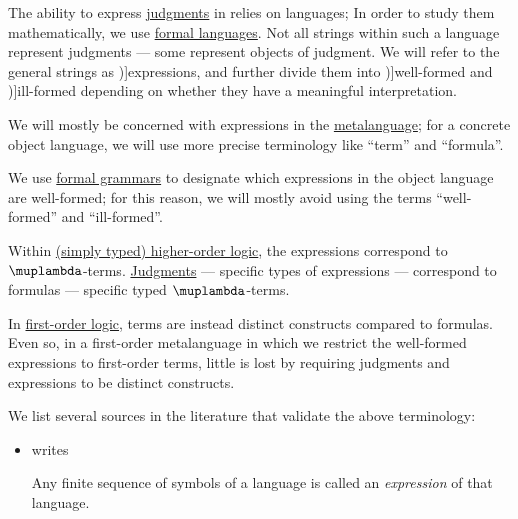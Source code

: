 \begin{concept}\label{con:expression}
  The ability to express \hyperref[con:judgment]{judgments} in relies on languages; In order to study them mathematically, we use \hyperref[def:formal_language]{formal languages}. Not all strings within such a language represent judgments --- some represent objects of judgment. We will refer to the general strings as \term[en=expressions (\cite[3]{Shoenfield1967MathematicalLogic})]{expressions}, and further divide them into \term[en=well-formed (formula) (\cite[217]{Kleene2002Logic})]{well-formed} and \term[en=ill-formed (statement) (\cite[266]{Tao2022AnalysisI})]{ill-formed} depending on whether they have a meaningful interpretation.
\end{concept}
\begin{comments}
  \item We will mostly be concerned with expressions in the \hyperref[con:metalanguage]{metalanguage}; for a concrete object language, we will use more precise terminology like \enquote{term} and \enquote{formula}.

  \item We use \hyperref[def:formal_grammar]{formal grammars} to designate which expressions in the object language are well-formed; for this reason, we will mostly avoid using the terms \enquote{well-formed} and \enquote{ill-formed}.

  \item Within \hyperref[def:higher_order_logic]{(simply typed) higher-order logic}, the expressions correspond to \( \muplambda \)-terms. \hyperref[con:judgment]{Judgments} --- specific types of expressions --- correspond to formulas --- specific typed \( \muplambda \)-terms.

  In \hyperref[def:first_order_logic]{first-order logic}, terms are instead distinct constructs compared to formulas. Even so, in a first-order metalanguage in which we restrict the well-formed expressions to first-order terms, little is lost by requiring judgments and expressions to be distinct constructs.

  \item We list several sources in the literature that validate the above terminology:
  \begin{itemize}
    \item \Textcite[3]{Shoenfield1967MathematicalLogic} writes
    \begin{displayquote}
      Any finite sequence of symbols of a language is called an \textit{expression} of that language.
    \end{displayquote}


\end{itemize}
\end{comments}
